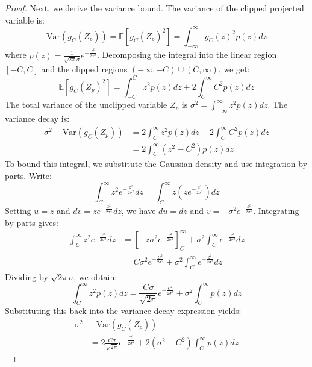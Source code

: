 \documentclass{article}
\theoremstyle{plain}
\theoremstyle{definition}
\theoremstyle{remark}
\begin{document}
\begin{proof}
Next, we derive the variance bound. The variance of the clipped projected variable is:
\begin{equation}
\text{Var}(g_C(Z_p)) = \mathbb{E}[g_C(Z_p)^2] = \int_{-\infty}^{\infty} g_C(z)^2 p(z) dz
\end{equation}
where $p(z) = \frac{1}{\sqrt{2\pi}\sigma} e^{-\frac{z^2}{2\sigma^2}}$. Decomposing the integral into the linear region $[-C, C]$ and the clipped regions $(-\infty, -C) \cup (C, \infty)$, we get:
\begin{equation}
\mathbb{E}[g_C(Z_p)^2] = \int_{-C}^C z^2 p(z) dz + 2 \int_{C}^{\infty} C^2 p(z) dz
\end{equation}
The total variance of the unclipped variable $Z_p$ is $\sigma^2 = \int_{-\infty}^{\infty} z^2 p(z) dz$. The variance decay is:
\begin{align}
\sigma^2 - \text{Var}(g_C(Z_p)) &= 2 \int_{C}^{\infty} z^2 p(z) dz - 2 \int_{C}^{\infty} C^2 p(z) dz \nonumber \\
&= 2 \int_{C}^{\infty} (z^2 - C^2) p(z) dz
\end{align}
To bound this integral, we substitute the Gaussian density and use integration by parts. Write:
\begin{equation}
\int_{C}^{\infty} z^2 e^{-\frac{z^2}{2\sigma^2}} dz = \int_{C}^{\infty} z \left( z e^{-\frac{z^2}{2\sigma^2}} \right) dz
\end{equation}
Setting $u = z$ and $dv = z e^{-\frac{z^2}{2\sigma^2}} dz$, we have $du = dz$ and $v = -\sigma^2 e^{-\frac{z^2}{2\sigma^2}}$. Integrating by parts gives:
\begin{align}
\int_{C}^{\infty} z^2 e^{-\frac{z^2}{2\sigma^2}} dz &= \left[ -z \sigma^2 e^{-\frac{z^2}{2\sigma^2}} \right]_{C}^{\infty} + \sigma^2 \int_{C}^{\infty} e^{-\frac{z^2}{2\sigma^2}} dz \nonumber \\
&= C \sigma^2 e^{-\frac{C^2}{2\sigma^2}} + \sigma^2 \int_{C}^{\infty} e^{-\frac{z^2}{2\sigma^2}} dz
\end{align}
Dividing by $\sqrt{2\pi}\sigma$, we obtain:
\begin{equation}
\int_{C}^{\infty} z^2 p(z) dz = \frac{C \sigma}{\sqrt{2\pi}} e^{-\frac{C^2}{2\sigma^2}} + \sigma^2 \int_{C}^{\infty} p(z) dz
\end{equation}
Substituting this back into the variance decay expression yields:
\begin{align}
\sigma^2 &- \text{Var}(g_C(Z_p)) \nonumber \\
&= 2 \frac{C \sigma}{\sqrt{2\pi}} e^{-\frac{C^2}{2\sigma^2}} + 2(\sigma^2 - C^2) \int_{C}^{\infty} p(z) dz

\end{align}
\end{proof}
\end{document}

